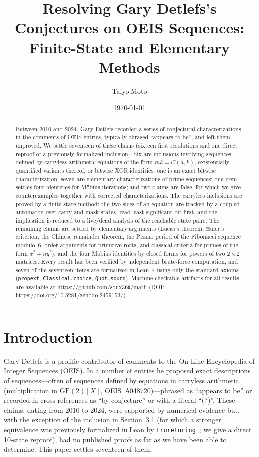 \documentclass[11pt]{article}
\title{Resolving Gary Detlefs's Conjectures on OEIS Sequences:
Finite-State and Elementary Methods}
\author{Taiyo Moto}
\date{\today} %
\begin{document}
\maketitle

\begin{abstract}
Between 2010 and 2024, Gary Detlefs recorded a series of conjectural characterizations in the comments of OEIS entries, typically phrased ``appears to be'', and left them unproved. We settle seventeen of these claims (sixteen first resolutions and one direct reproof of a previously formalized inclusion). Six are inclusions involving sequences defined by carryless-arithmetic equations of the form $mk = C(a,k)$, existentially quantified variants thereof, or bitwise XOR identities; one is an exact bitwise characterization; seven are elementary characterizations of prime sequences; one item settles four identities for M\"obius iterations; and two claims are false, for which we give counterexamples together with corrected characterizations. The carryless inclusions are proved by a finite-state method: the two sides of an equation are tracked by a coupled automaton over carry and mask states, read least significant bit first, and the implication is reduced to a live/dead analysis of the reachable state pairs. The remaining claims are settled by elementary arguments (Lucas's theorem, Euler's criterion, the Chinese remainder theorem, the Pisano period of the Fibonacci sequence modulo~6, order arguments for primitive roots, and classical criteria for primes of the form $x^2 + ny^2$), and the four M\"obius identities by closed forms for powers of two $2 \times 2$ matrices. Every result has been verified by independent brute-force computation, and seven of the seventeen items are formalized in Lean~4 using only the standard axioms (\texttt{propext}, \texttt{Classical.choice}, \texttt{Quot.sound}). Machine-checkable artifacts for all results are available at \url{https://github.com/soux369/math} (DOI: \url{https://doi.org/10.5281/zenodo.24591537}).
\end{abstract}

\section{Introduction}

Gary Detlefs is a prolific contributor of comments to the On-Line Encyclopedia of Integer Sequences (OEIS). In a number of entries he proposed exact descriptions of sequences---often of sequences defined by equations in carryless arithmetic (multiplication in $\mathrm{GF}(2)[X]$, OEIS~A048720)---phrased as ``appears to be'' or recorded in cross-references as ``by conjecture'' or with a literal ``(?)''. These claims, dating from 2010 to 2024, were supported by numerical evidence but, with the exception of the inclusion in Section~3.1 (for which a stronger equivalence was previously formalized in Lean by \texttt{trureturing}~\cite{trureturing2026}; we give a direct 10-state reproof), had no published proofs as far as we have been able to determine. This paper settles seventeen of them.
\end{document}
